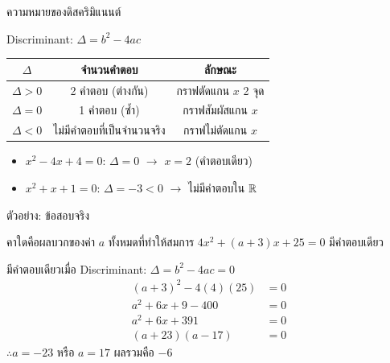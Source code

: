 \documentclass[11pt, aspectratio=169]{beamer}
\begin{document}
\begin{frame}{ความหมายของดิสคริมิแนนต์}
  \begin{explanation}
    Discriminant: $\Delta = b^2 - 4ac$
    \begin{center}
      \begin{tabular}{c|c|c}
        $\Delta$ & จำนวนคำตอบ & ลักษณะ \\
        \hline
        $\Delta > 0$ & 2 คำตอบ (ต่างกัน) & กราฟตัดแกน $x$ 2 จุด \\
        $\Delta = 0$ & 1 คำตอบ (ซํ้า) & กราฟสัมผัสแกน $x$ \\
        $\Delta < 0$ & ไม่มีคำตอบที่เป็นจำนวนจริง & กราฟไม่ตัดแกน $x$
      \end{tabular}
    \end{center}
  \end{explanation}

  \begin{exambox}[ตัวอย่าง]
    \begin{itemize}
      \item $x^2 - 4x + 4 = 0$: $\Delta = 0$ $\rightarrow$ $x = 2$ (คำตอบเดียว)
      \item $x^2 + x + 1 = 0$: $\Delta = -3 < 0$ $\rightarrow$ ไม่มีคำตอบใน $\mathbb{R}$
    \end{itemize}
  \end{exambox}
\end{frame}

\begin{frame}{ตัวอย่าง: ข้อสอบจริง}
  \begin{exambox}[ข้อสอบปี 65 ข้อ 23]
    คาใดคือผลบวกของค่า $a$ ทั้งหมดที่ทำให้สมการ $4x^2+(a+3)x+25=0$ มีคำตอบเดียว
  \end{exambox}

  \begin{solbox}
      มีคำตอบเดียวเมื่อ Discriminant: $\Delta = b^2 - 4ac=0$ 
      \begin{align*}
        (a+3)^2-4(4)(25)&=0 \\
        a^2+6x+9-400&=0 \\
        a^2+6x+391&=0 \\
        (a+23)(a-17)&=0
      \end{align*}
      $\therefore a=-23$ หรือ $a=17$ ผลรวมคือ $-6$ 
  \end{solbox}
\end{frame}


\end{document}
